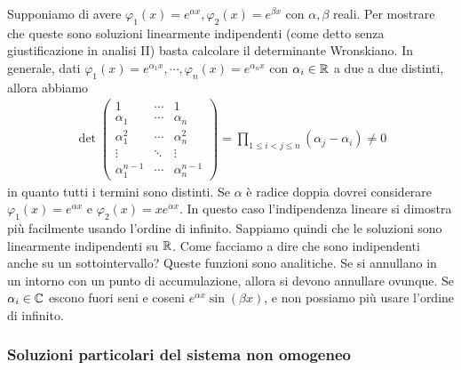 \documentclass[a4paper]{article}
\begin{document}
\begin{radioactive}
Supponiamo di avere \(\varphi_1(x) = e^{\alpha x}, \varphi_2(x) = e^{\beta x}\)
con \(\alpha,\beta\) reali.
Per mostrare che queste sono soluzioni linearmente indipendenti (come detto senza giustificazione in analisi II)
basta calcolare il determinante Wronskiano.
In generale, dati \(\varphi_1(x) = e^{\alpha_1 x}, \cdots, \varphi_n(x) = e^{\alpha_n x}\)
con \(\alpha_i \in \mathbb{R}\) a due a due distinti, allora abbiamo
\begin{align*}
    \det
    \begin{pmatrix}
        1 & \cdots & 1 \\
        \alpha_1 & \cdots & \alpha_n \\
        \alpha_1^2 & \cdots & \alpha_n^2 \\
        \vdots & \ddots & \vdots \\
        \alpha_1^{n-1} & \cdots & \alpha_n^{n-1}
    \end{pmatrix} = \prod_{1 \leq i < j \leq n}(\alpha_j - \alpha_i) \neq 0
\end{align*}
in quanto tutti i termini sono distinti.
Se \(\alpha\) è radice doppia dovrei considerare
\(\varphi_1(x) = e^{\alpha x}\) e \(\varphi_2(x) = xe^{\alpha x}\).
In questo caso l'indipendenza lineare si dimostra più facilmente usando l'ordine di infinito.
Sappiamo quindi che le soluzioni sono linearmente indipendenti su \(\mathbb{R}\).
Come facciamo a dire che sono indipendenti anche su un sottointervallo?
Queste funzioni sono analitiche. Se si annullano in un intorno con un punto di accumulazione,
allora si devono annullare ovunque.
Se \(\alpha_i \in \mathbb{C}\) escono fuori seni e coseni \(e^{\alpha x}\sin(\beta x)\),
e non possiamo più usare l'ordine di infinito.
\end{radioactive}

\subsubsection{Soluzioni particolari del sistema non omogeneo}
\end{document}
